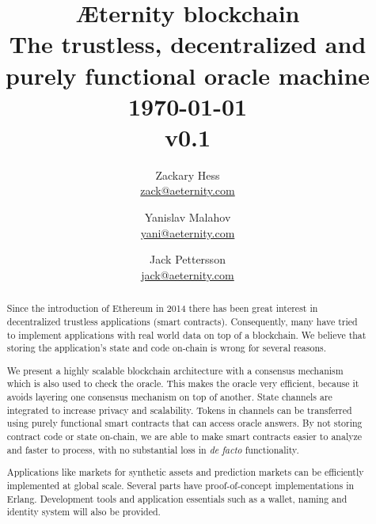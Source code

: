 \documentclass[a4paper, 10pt, conference]{ieeeconf}      %
\title{\huge Æternity blockchain\\[0.5em] \large The trustless, decentralized and purely functional oracle machine \\[1em]\today \\[1em] v0.1 }
\author{Zackary Hess \\ \href{mailto:zack@aeternity.com}{zack@aeternity.com}  
\and Yanislav Malahov \\ \href{mailto:yani@aeternity.com}{yani@aeternity.com}
\and Jack Pettersson \\ \href{mailto:jack@aeternity.com}{jack@aeternity.com} 
}
\begin{document}
\maketitle

\begin{abstract}

Since the introduction of Ethereum in 2014 there has been great interest in decentralized trustless applications (smart contracts). Consequently, many have tried to implement applications with real world data on top of a blockchain. We believe that storing the application's state and code on-chain is wrong for several reasons.


We present a highly scalable blockchain architecture with a consensus mechanism which is also used to check the oracle. This makes the oracle very efficient, because it avoids layering one consensus mechanism on top of another. State channels are integrated to increase privacy and scalability. Tokens in channels can be transferred using purely functional smart contracts that can access oracle answers. %
By not storing contract code or state on-chain, we are able to make smart contracts easier to analyze and faster to process, with no substantial loss in \emph{de facto} functionality.

Applications like markets for synthetic assets and prediction markets can be efficiently implemented at global scale. Several parts have proof-of-concept implementations in Erlang. Development tools and application essentials such as a wallet, naming and identity system will also be provided.
\end{abstract}



\tableofcontents
\thispagestyle{plain} %
\pagestyle{plain} %
\end{document}
